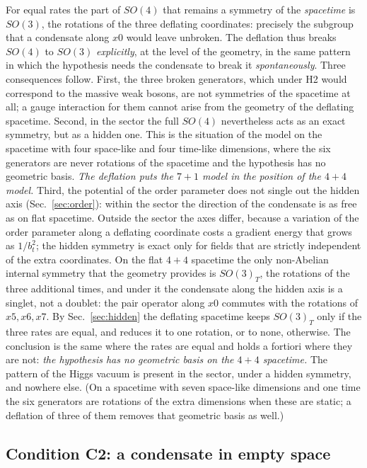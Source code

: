 For equal rates the part of $SO(4)$ that remains a symmetry of the \emph{spacetime} is $SO(3)$, the
rotations of the three deflating coordinates: precisely the subgroup that a condensate along $x0$
would leave unbroken.
The deflation thus breaks $SO(4)$ to $SO(3)$ \emph{explicitly}, at the level of the geometry, in
the same pattern in which the hypothesis needs the condensate to break it \emph{spontaneously}.
Three consequences follow. First, the three broken generators, which under H2 would correspond to
the massive weak bosons, are not symmetries of the spacetime at all; a gauge interaction for them
cannot arise from the geometry of the deflating spacetime. Second, in the sector the full $SO(4)$
nevertheless acts as an exact symmetry, but as a hidden one. This is the situation of the model on
the spacetime with four space-like and four time-like dimensions, where the six generators are never
rotations of the spacetime and the hypothesis has no geometric basis. \emph{The deflation puts the
$7+1$ model in the position of the $4+4$ model.} Third, the potential of the order parameter does not single out the hidden axis
(Sec.~\ref{sec:order}): within the sector the direction of the condensate is as free as on flat
spacetime. Outside the sector the axes differ, because a variation of the order parameter along a
deflating coordinate costs a gradient energy that grows as $1/b_t^{2}$; the hidden symmetry is exact
only for fields that are strictly independent of the extra coordinates.
On the flat $4+4$ spacetime the only non-Abelian internal symmetry that the geometry provides is
$SO(3)_T$, the rotations of the three additional times, and under it the condensate along the hidden
axis is a singlet, not a doublet: the pair operator along $x0$ commutes with the rotations of
$x5,x6,x7$. By Sec.~\ref{sec:hidden} the deflating spacetime
keeps $SO(3)_T$ only if the three rates are equal, and reduces it to one rotation, or to none,
otherwise. The conclusion is the same where the rates are equal and holds a
fortiori where they are not: \emph{the hypothesis has no geometric basis on the $4+4$ spacetime.}
The pattern of the Higgs vacuum is present in the sector, under a hidden symmetry, and nowhere else.
(On a spacetime with seven space-like dimensions and one time the six generators are rotations of
the extra dimensions when these are static; a deflation of three of them removes that geometric
basis as well.)

\subsection{Condition C2: a condensate in empty space}

